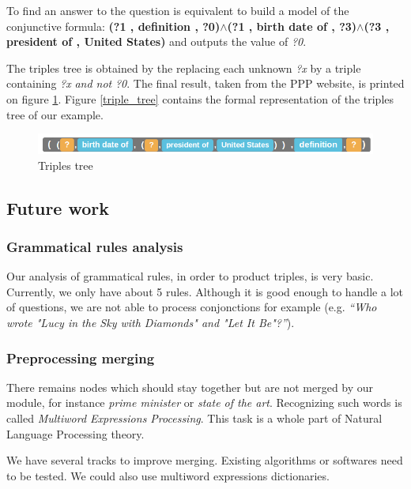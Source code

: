 To find an answer to the question is equivalent to build a model of the conjunctive formula: \textbf{(?1 , definition , ?0)$\wedge$(?1 , birth date of , ?3)$\wedge$(?3 , president of , United States)} and outputs the value of \textit{?0}.

The triples tree is obtained by the replacing each unknown \textit{?x} by a triple containing \textit{?x} \textit{and not} \textit{?0}. The final result, taken from the PPP website, is printed on figure \ref{tree_four}. Figure \ref{triple_tree} contains the formal representation of the triples tree of our example.

\begin{figure}[!h]
  \centering
  \label{tree_four}
    \includegraphics[scale=0.5]{../examples_NLP_classical/final_result.png}
  \caption{Triples tree}
\end{figure}


\subsection{Future work}

\subsubsection{Grammatical rules analysis}

Our analysis of grammatical rules, in order to product triples, is very basic. Currently, we only have about 5 rules. Although it is good enough to handle a lot of questions, we are not able to process conjonctions for example (e.g. \textit{``Who wrote "Lucy in the Sky with Diamonds" and "Let It Be"?''}).

\subsubsection{Preprocessing merging}

There remains nodes which should stay together but are not merged by our module, for instance \emph{prime minister} or \emph{state of the art}. Recognizing such words is called \emph{Multiword Expressions Processing}. This task is a whole part of Natural Language Processing theory. 

We have several tracks to improve merging. Existing algorithms or softwares need to be tested. We could also use multiword expressions dictionaries.

